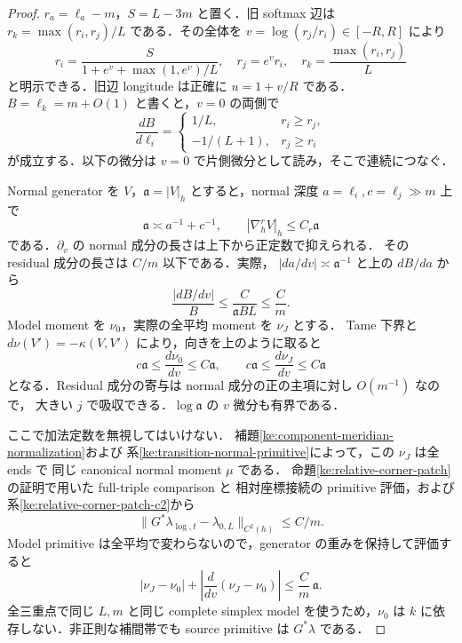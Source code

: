 \begin{proof}
$r_a=\ell_a-m$，$S=L-3m$ と置く．旧 softmax 辺は
$r_k=\max(r_i,r_j)/L$ である．その全体を
$v=\log(r_j/r_i)\in[-R,R]$ により
\begin{equation}\label{ke:eq:hexagon-edge-profile}
 r_i=\frac{S}{1+e^v+\max(1,e^v)/L},\quad
 r_j=e^v r_i,\quad r_k=\frac{\max(r_i,r_j)}L
\end{equation}
と明示できる．旧辺 longitude は正確に $u=1+v/R$ である．
$B=\ell_k=m+O(1)$ と書くと，$v=0$ の両側で
\[
 \frac{dB}{d\ell_i}=
 \begin{cases}1/L,&r_i\ge r_j,\\-1/(L+1),&r_j\ge r_i\end{cases}
\]
が成立する．以下の微分は $v=0$ で片側微分として読み，そこで連続につなぐ．

Normal generator を $V$，$\mathfrak a=|V|_h$ とすると，normal 深度
$a=\ell_i,c=\ell_j\gg m$ 上で
\[
 \mathfrak a\asymp a^{-1}+c^{-1},\qquad
 |\nabla_h^rV|_h\le C_r\mathfrak a
\]
である．$\partial_v$ の normal 成分の長さは上下から正定数で抑えられる．
その residual 成分の長さは $C/m$ 以下である．実際，
$|da/dv|\asymp\mathfrak a^{-1}$ と上の $dB/da$ から
\[
 \frac{|dB/dv|}B\le\frac C{\mathfrak a BL}\le\frac C m .
\]
Model moment を $\nu_0$，実際の全平均 moment を $\nu_J$ とする．
Tame 下界と
$d\nu(V')=-\kappa(V,V')$ により，向きを上のように取ると
\begin{equation}\label{ke:eq:edge-moment-weighted-derivative}
 c\mathfrak a\le\frac{d\nu_0}{dv}\le C\mathfrak a,
 \qquad
 c\mathfrak a\le\frac{d\nu_J}{dv}\le C\mathfrak a
\end{equation}
となる．Residual 成分の寄与は normal 成分の正の主項に対し $O(m^{-1})$ なので，
大きい $j$ で吸収できる．$\log\mathfrak a$ の $v$ 微分も有界である．

ここで加法定数を無視してはいけない．
補題\ref{ke:component-meridian-normalization}および
系\ref{ke:transition-normal-primitive}によって，この $\nu_J$ は全 ends で
同じ canonical normal moment $\mu$ である．
命題\ref{ke:relative-corner-patch}の証明で用いた full-triple comparison と
相対座標接続の primitive 評価，および系\ref{ke:relative-corner-patch-c2}から
\[
 \|G^*\lambda_{\log,t}-\lambda_{0,L}\|_{C^2(h)}\le C/m.
\]
Model primitive は全平均で変わらないので，generator の重みを保持して評価すると
\begin{equation}\label{ke:eq:edge-moment-weighted-error}
 |\nu_J-\nu_0|+
 \left|\frac d{dv}(\nu_J-\nu_0)\right|
 \le\frac C m\,\mathfrak a .
\end{equation}
全三重点で同じ $L,m$ と同じ complete simplex model を使うため，$\nu_0$ は
$k$ に依存しない．非正則な補間帯でも source primitive は $G^*\lambda$ である．


\end{proof}
